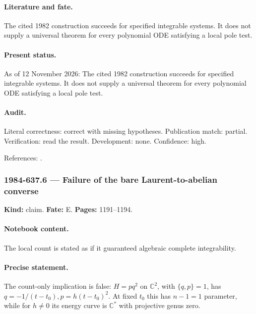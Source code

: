 \paragraph{Literature and fate.} The cited 1982 construction succeeds for specified integrable systems. It does not supply a universal theorem for every polynomial ODE satisfying a local pole test.

\paragraph{Present status.} As of 12 November 2026: The cited 1982 construction succeeds for specified integrable systems. It does not supply a universal theorem for every polynomial ODE satisfying a local pole test.

\paragraph{Audit.} Literal correctness: correct with missing hypotheses. Publication match: partial. Verification: read the result. Development: none. Confidence: high.

\noindent References: \citep{adler1982kowalewski,adler1987quadrics}.\par

\subsubsection{1984-637.6 --- Failure of the bare Laurent-to-abelian converse}

\label{item:1984-637.6}

\noindent\textbf{Kind:} claim. \textbf{Fate:} E. \textbf{Pages:} 1191--1194.\par

\paragraph{Notebook content.} The local count is stated as if it guaranteed algebraic complete integrability.

\paragraph{Precise statement.} The count-only implication is false: \(H=pq^2\) on \(\mathbb C^2\), with \(\{q,p\}=1\), has \(q=-1/(t-t_0),p=h(t-t_0)^2\). At fixed \(t_0\) this has \(n-1=1\) parameter, while for \(h\ne0\) its energy curve is \(\mathbb C^*\) with projective genus zero.


